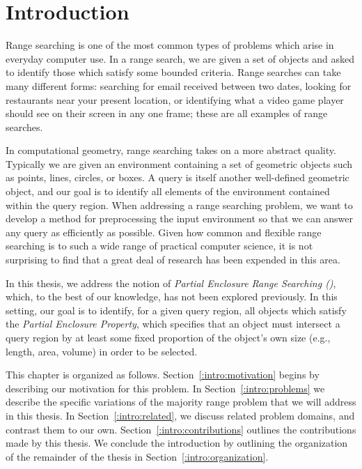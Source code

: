 \chapter{Introduction}
\label{:intro}

Range searching is one of the most common types of problems which arise in everyday computer use. 
In a range search, we are given a set of objects and asked to identify those which satisfy some bounded criteria. 
Range searches can take many different forms: searching for email received between two dates, looking for restaurants near your present location, or identifying what a video game player should see on their screen in any one frame; these are all examples of range searches.

In computational geometry, range searching takes on a more abstract quality. 
Typically we are given an environment containing a set of geometric objects such as points, lines, circles, or boxes. 
A query is itself another well-defined geometric object, and our goal is to identify all elements of the environment contained within the query region.  
When addressing a range searching problem, we want to develop a method for preprocessing the input environment so that we can answer any query as efficiently as possible.
Given how common and flexible range searching is to such a wide range of practical computer science, it is not surprising to  find that a great deal of research has been expended in this area.  

In this thesis, we address the notion of \emph{Partial Enclosure Range Searching (\PERS{})}, which, to the best of our knowledge, has not been explored previously. 
In this setting, our goal is to identify, for a given query region, all objects which satisfy the \emph{Partial Enclosure Property}, which specifies that an object must intersect a query region by at least some fixed proportion of the object's own size (e.g., length, area, volume) in order to be selected.

This chapter is organized as follows.
Section~\ref{:intro:motivation} begins by describing our motivation for this problem. 
In Section~\ref{:intro:problems} we describe the specific variations of the majority range problem that we will address in this thesis. 
In Section~\ref{:intro:related}, we discuss related problem domains, and contrast them to our own.
Section~\ref{:intro:contributions} outlines the contributions made by this thesis.
We conclude the introduction by outlining the organization of the remainder of the thesis in Section~\ref{:intro:organization}.


